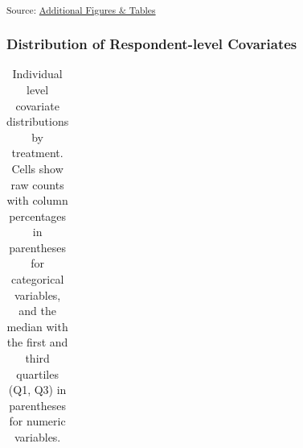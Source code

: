\documentclass[
  10pt,
  a4paper,
  DIV=11,
  numbers=noendperiod]{scrartcl}
\begin{document}
\begin{longtable}[]
\end{longtable}

\textsubscript{Source:
\href{https://dertristan.github.io/MBEU25/code/09_additional_figs_tables-preview.html\#cell-tbl-balance-round-mods}{Additional
Figures \& Tables}}

\subsubsection*{Distribution of Respondent-level
Covariates}\label{distribution-of-respondent-level-covariates}

\begin{longtable}[]{@{}
  >{\raggedright\arraybackslash}p{}
  >{\raggedright\arraybackslash}p{}
  >{\raggedright\arraybackslash}p{}@{}}

\caption{\label{tbl-balance-resp-mods}Individual level covariate
distributions by treatment. Cells show raw counts with column
percentages in parentheses for categorical variables, and the median
with the first and third quartiles (Q1, Q3) in parentheses for numeric
variables.}

\tabularnewline


\end{longtable}
\end{document}
